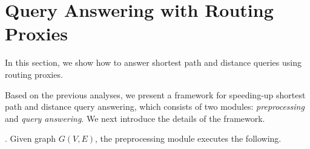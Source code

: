 \section{Query Answering with Routing Proxies}
\label{sec-query}

In this section, we show how to answer shortest path and distance queries using routing proxies.


 Based on the previous analyses, we present a framework for speeding-up shortest  path and distance query answering, which consists of two modules: {\em preprocessing} and {\em query answering}.
 We next introduce the details of the framework.

. Given graph $G(V, E)$, the preprocessing module executes the following.

